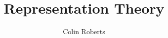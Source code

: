 \documentclass[12pt]{article}
\title{Representation Theory}
\author{Colin Roberts}
\providecommand{\keywords}[1]
{
    \hspace*{0pt}\small	
  \textbf{\textit{Keywords--}} #1
}
\begin{document}
\begin{titlingpage}
    \maketitle
    \vfill

\end{titlingpage}


\end{document}
